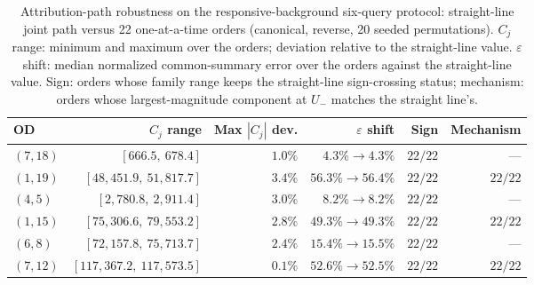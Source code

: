 \begin{table}[t]\centering\footnotesize
\caption{Attribution-path robustness on the responsive-background six-query
protocol: straight-line joint path versus 22 one-at-a-time orders
(canonical, reverse, 20 seeded permutations). $C_j$ range: minimum and
maximum over the orders; deviation relative to the straight-line
value. $\varepsilon$ shift: median normalized common-summary error
over the orders against the straight-line value. Sign: orders whose
family range keeps the straight-line sign-crossing status; mechanism:
orders whose largest-magnitude component at $U_-$ matches the straight
line's.}\label{tab:pathrobust}
\begin{tabular}{lrrrrr}\toprule
OD & $C_j$ range & Max $|C_j|$ dev. & $\varepsilon$ shift & Sign & Mechanism\\\midrule
$(7,18)$ & $[666.5,\ 678.4]$ & $1.0\%$ & $4.3\%\to4.3\%$ & $22/22$ & ---\\
$(1,19)$ & $[48{,}451.9,\ 51{,}817.7]$ & $3.4\%$ & $56.3\%\to56.4\%$ & $22/22$ & $22/22$\\
$(4,5)$ & $[2{,}780.8,\ 2{,}911.4]$ & $3.0\%$ & $8.2\%\to8.2\%$ & $22/22$ & ---\\
$(1,15)$ & $[75{,}306.6,\ 79{,}553.2]$ & $2.8\%$ & $49.3\%\to49.3\%$ & $22/22$ & $22/22$\\
$(6,8)$ & $[72{,}157.8,\ 75{,}713.7]$ & $2.4\%$ & $15.4\%\to15.5\%$ & $22/22$ & ---\\
$(7,12)$ & $[117{,}367.2,\ 117{,}573.5]$ & $0.1\%$ & $52.6\%\to52.5\%$ & $22/22$ & $22/22$\\
\bottomrule\end{tabular}\end{table}
